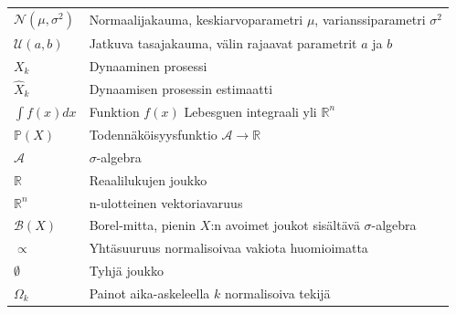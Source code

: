 \documentclass[
  12pt,
  a4paper, twoside]{book}
\begin{document}
\begin{table}
\begin{tabular}[t]{ll}
$\mathcal{N}(\mu, \sigma^2)$ & Normaalijakauma, keskiarvoparametri $\mu$, varianssiparametri $\sigma^2$\\
$\mathcal{U}(a, b)$ & Jatkuva tasajakauma, välin rajaavat parametrit $a$ ja $b$\\
$X_k$ & Dynaaminen prosessi\\
\addlinespace
$\hat{X}_k$ & Dynaamisen prosessin estimaatti\\
$\int f(x)dx$ & Funktion $f(x)$ Lebesguen integraali yli $\mathbb{R}^n$\\
$\mathbb{P}(X)$ & Todennäköisyysfunktio $\mathcal{A}\rightarrow\mathbb{R}$\\
$\mathcal{A}$ & $\sigma$-algebra\\
$\mathbb{R}$ & Reaalilukujen joukko\\
\addlinespace
$\mathbb{R}^n$ & n-ulotteinen vektoriavaruus\\
$\mathcal{B}(X)$ & Borel-mitta, pienin $X$:n avoimet joukot sisältävä $\sigma$-algebra\\
$\propto$ & Yhtäsuuruus normalisoivaa vakiota huomioimatta\\
$\emptyset$ & Tyhjä joukko\\
$\Omega_k$ & Painot aika-askeleella $k$ normalisoiva tekijä\\
\bottomrule
\end{tabular}
\end{table}
\end{document}
